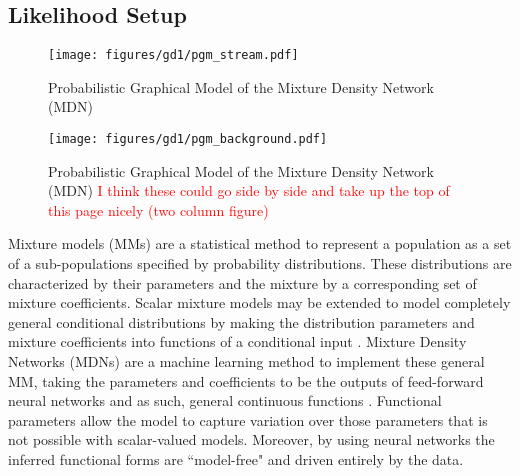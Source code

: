 \documentclass[twocolumn]{aastex631}
\newcommand{\TODO}[1]{{\textcolor{red}{#1}}}
\newcommand{\JN}[1]{\TODO{#1}}
\begin{document}
    \subsection{Likelihood Setup}\label{sub:method:likelihood_setup}

        \begin{figure}
            \centering
            \texttt{[image: figures/gd1/pgm\_stream.pdf]}
            \caption{Probabilistic Graphical Model of the Mixture Density Network (MDN)}
            \label{fig:PGM_stream}
        \end{figure}

        \begin{figure}
            \centering
            \texttt{[image: figures/gd1/pgm\_background.pdf]}
            \caption{Probabilistic Graphical Model of the Mixture Density Network (MDN) \JN{I think these could go side by side and take up the top of this page nicely (two column figure)}}
            \label{fig:PGM_background}
        \end{figure}

        Mixture models (MMs) are a statistical method to represent a population
        as a set of a sub-populations specified by probability distributions.
        These distributions are characterized by their parameters and the
        mixture by a corresponding set of mixture coefficients. Scalar mixture
        models may be extended to model completely general conditional
        distributions by making the distribution parameters and mixture
        coefficients into functions of a conditional input
        \citep{McLachlanBasford1989}.  Mixture Density Networks (MDNs) are a
        machine learning method to implement these general MM, taking the
        parameters and coefficients to be the outputs of feed-forward neural
        networks and as such, general continuous functions \citep{Bishop1994}.
        Functional parameters allow the model to capture variation over those
        parameters that is not possible with scalar-valued models. Moreover, by
        using neural networks the inferred functional forms are ``model-free"
        and driven entirely by the data.
\end{document}
